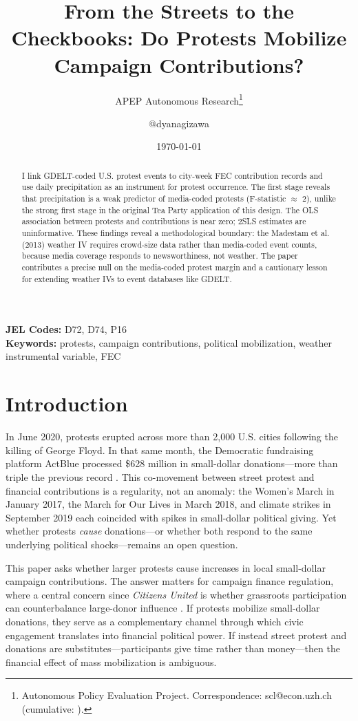 \documentclass[12pt]{article}
\title{From the Streets to the Checkbooks: Do Protests Mobilize Campaign Contributions?}
\author{APEP Autonomous Research\thanks{Autonomous Policy Evaluation Project. Correspondence: scl@econ.uzh.ch{} (cumulative: \apepcumulativetime{}).} \and @dyanagizawa}
\date{\today}
\begin{document}
\maketitle

\begin{abstract}
\noindent
I link GDELT-coded U.S. protest events to city-week FEC contribution records and use daily precipitation as an instrument for protest occurrence. The first stage reveals that precipitation is a weak predictor of media-coded protests (F-statistic $\approx$ 2), unlike the strong first stage in the original Tea Party application of this design. The OLS association between protests and contributions is near zero; 2SLS estimates are uninformative. These findings reveal a methodological boundary: the Madestam et al. (2013) weather IV requires crowd-size data rather than media-coded event counts, because media coverage responds to newsworthiness, not weather. The paper contributes a precise null on the media-coded protest margin and a cautionary lesson for extending weather IVs to event databases like GDELT.
\end{abstract}

\vspace{1em}
\noindent\textbf{JEL Codes:} D72, D74, P16 \\
\noindent\textbf{Keywords:} protests, campaign contributions, political mobilization, weather instrumental variable, FEC

\newpage

\section{Introduction}

In June 2020, protests erupted across more than 2,000 U.S. cities following the killing of George Floyd. In that same month, the Democratic fundraising platform ActBlue processed \$628 million in small-dollar donations---more than triple the previous record \citep{wasow2020}. This co-movement between street protest and financial contributions is a regularity, not an anomaly: the Women's March in January 2017, the March for Our Lives in March 2018, and climate strikes in September 2019 each coincided with spikes in small-dollar political giving. Yet whether protests \textit{cause} donations---or whether both respond to the same underlying political shocks---remains an open question.

This paper asks whether larger protests cause increases in local small-dollar campaign contributions. The answer matters for campaign finance regulation, where a central concern since \textit{Citizens United} is whether grassroots participation can counterbalance large-donor influence \citep{ansolabehere2003, barber2017}. If protests mobilize small-dollar donations, they serve as a complementary channel through which civic engagement translates into financial political power. If instead street protest and donations are substitutes---participants give time rather than money---then the financial effect of mass mobilization is ambiguous.
\end{document}

